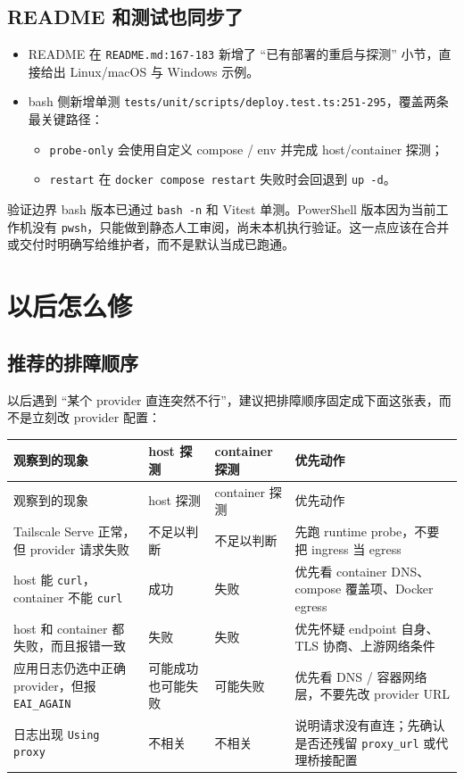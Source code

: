 \documentclass[a4paper]{article}
\newcommand{\filepath}[1]{\nolinkurl{#1}}
\begin{document}
\subsection{README 和测试也同步了}

\begin{itemize}
\item README 在 \filepath{README.md:167-183} 新增了 ``已有部署的重启与探测'' 小节，直接给出 Linux/macOS 与 Windows 示例。
\item bash 侧新增单测 \filepath{tests/unit/scripts/deploy.test.ts:251-295}，覆盖两条最关键路径：
  \begin{itemize}
  \item \texttt{probe-only} 会使用自定义 compose / env 并完成 host/container 探测；
  \item \texttt{restart} 在 \texttt{docker compose restart} 失败时会回退到 \texttt{up -d}。
  \end{itemize}
\end{itemize}

\begin{riskbox}{验证边界}
bash 版本已通过 \texttt{bash -n} 和 Vitest 单测。PowerShell 版本因为当前工作机没有 \texttt{pwsh}，只能做到静态人工审阅，尚未本机执行验证。这一点应该在合并或交付时明确写给维护者，而不是默认当成已跑通。
\end{riskbox}

\section{以后怎么修}

\subsection{推荐的排障顺序}

以后遇到 ``某个 provider 直连突然不行''，建议把排障顺序固定成下面这张表，而不是立刻改 provider 配置：

\begin{longtable}{p{4.1cm}p{3.3cm}p{4.1cm}p{2.8cm}}
\toprule
观察到的现象 & host 探测 & container 探测 & 优先动作 \\
\midrule
\endfirsthead
\toprule
观察到的现象 & host 探测 & container 探测 & 优先动作 \\
\midrule
\endhead
Tailscale Serve 正常，但 provider 请求失败 & 不足以判断 & 不足以判断 & 先跑 runtime probe，不要把 ingress 当 egress \\
host 能 \texttt{curl}，container 不能 \texttt{curl} & 成功 & 失败 & 优先看 container DNS、compose 覆盖项、Docker egress \\
host 和 container 都失败，而且报错一致 & 失败 & 失败 & 优先怀疑 endpoint 自身、TLS 协商、上游网络条件 \\
应用日志仍选中正确 provider，但报 \texttt{EAI\_AGAIN} & 可能成功也可能失败 & 可能失败 & 优先看 DNS / 容器网络层，不要先改 provider URL \\
日志出现 \texttt{Using proxy} & 不相关 & 不相关 & 说明请求没有直连；先确认是否还残留 \texttt{proxy\_url} 或代理桥接配置 \\
\bottomrule
\end{longtable}
\end{document}
